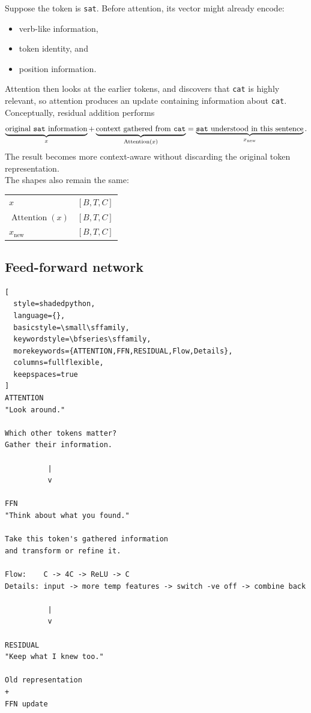 Suppose the token is \texttt{sat}. Before attention, its vector might already
encode:
\begin{itemize}
  \setlength{\itemsep}{0pt}
  \item verb-like information,
  \item token identity, and
  \item position information.
\end{itemize}

Attention then looks at the earlier tokens, and discovers that \texttt{cat} is highly relevant, so attention produces an
update containing information about \texttt{cat}. Conceptually, residual
addition performs
\[
  \underbrace{\text{original \texttt{sat} information}}_{x}
  +
  \underbrace{\text{context gathered from \texttt{cat}}}_{\operatorname{Attention}(x)}
  =
  \underbrace{\text{\texttt{sat} understood in this sentence}}_{x_{\text{new}}}.
\]
The result becomes more context-aware without discarding the original token representation. \\

The shapes also remain the same:
\begin{center}
\begin{tabular}{@{}lc@{}}
  \(x\) & \([B,T,C]\) \\
  \(\operatorname{Attention}(x)\) & \([B,T,C]\) \\
  \hline
  \(x_{\text{new}}\) & \([B,T,C]\)
\end{tabular}
\end{center}

\subsection{Feed-forward network}

\begin{lstlisting}[
  style=shadedpython,
  language={},
  basicstyle=\small\sffamily,
  keywordstyle=\bfseries\sffamily,
  morekeywords={ATTENTION,FFN,RESIDUAL,Flow,Details},
  columns=fullflexible,
  keepspaces=true
]
ATTENTION
"Look around."

Which other tokens matter?
Gather their information.

          |
          v

FFN
"Think about what you found."

Take this token's gathered information
and transform or refine it.

Flow:    C -> 4C -> ReLU -> C
Details: input -> more temp features -> switch -ve off -> combine back

          |
          v

RESIDUAL
"Keep what I knew too."

Old representation
+
FFN update
\end{lstlisting}


